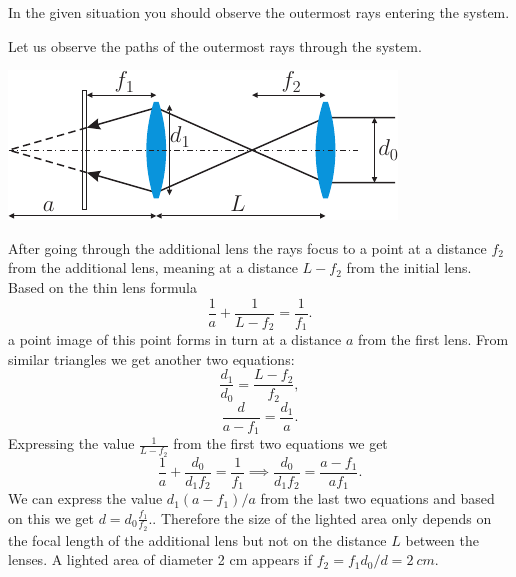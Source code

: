 {\ifEngHint
In the given situation you should observe the outermost rays entering the system.
\fi


\ifEngSolution
Let us observe the paths of the outermost rays through the system.
\begin{center}
\includegraphics[scale=1.5]{2015-v3g-02-valgustamine-lah}
\end{center}
After going through the additional lens the rays focus to a point at a distance $f_2$ from the additional lens, meaning at a distance $L-f_2$ from the initial lens. Based on the thin lens formula
\begin{equation}
\frac{1}{a}+\frac{1}{L-f_2}=\frac{1}{f_1}.
\end{equation} 
a point image of this point forms in turn at a distance $a$ from the first lens. From similar triangles we get another two equations:
\begin{equation}
\frac{d_1}{d_0}=\frac{L-f_2}{f_2},
\end{equation} 
\begin{equation}
\frac{d}{a-f_1}=\frac{d_1}{a}.
\end{equation}
Expressing the value $\frac{1}{L-f_2}$ from the first two equations we get
\begin{equation}
\frac{1}{a}+\frac{d_0}{d_1f_2}=\frac{1}{f_1}\implies \frac{d_0}{d_1f_2}=\frac{a-f_1}{af_1}.
\end{equation} 
We can express the value $d_1(a-f_1)/a$ from the last two equations and based on this we get $d=d_0\frac{f_1}{f_2}.$. Therefore the size of the lighted area only depends on the focal length of the additional lens but not on the distance $L$ between the lenses. A lighted area of diameter 2 cm appears if $f_2=f_1d_0/d=\SI{2}{cm}$.
\fi
}